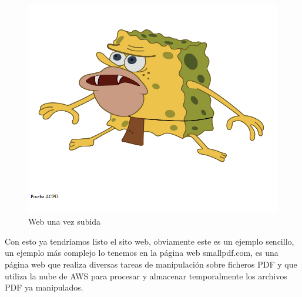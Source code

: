 \begin{figure}[h]
	\centering
	\includegraphics[scale=0.55]{web_azure/web5.png}
	\caption{Web una vez subida}
	\label{AZWEB9}
\end{figure}

Con esto ya tendríamos listo el sito web, obviamente este es un ejemplo sencillo, un ejemplo más complejo lo tenemos en la página web smallpdf.com, es una página web que realiza diversas tareas de manipulación sobre ficheros PDF y que utiliza la nube de AWS para procesar y almacenar temporalmente los archivos PDF ya manipulados.


